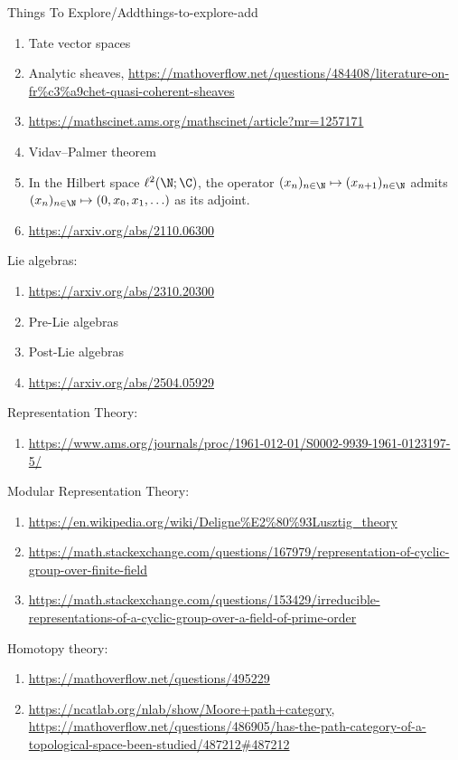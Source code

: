 \begin{remark}{Things To Explore/Add}{things-to-explore-add}
\begin{enumerate}
        \item Tate vector spaces
        \item Analytic sheaves, \url{https://mathoverflow.net/questions/484408/literature-on-fr\%c3\%a9chet-quasi-coherent-sheaves}
        \item \url{https://mathscinet.ams.org/mathscinet/article?mr=1257171}
        \item Vidav--Palmer theorem
        \item In the Hilbert space $\ell^{2}(\N;\C)$, the operator $(x_{n})_{n\in\N}\mapsto(x_{n+1})_{n\in\N}$ admits $(x_{n})_{n\in\N}\mapsto(0,x_{0},x_{1},\ldots)$ as its adjoint.
        \item \url{https://arxiv.org/abs/2110.06300}
    \end{enumerate}
    Lie algebras:
    \begin{enumerate}
        \item \url{https://arxiv.org/abs/2310.20300}
        \item Pre-Lie algebras
        \item Post-Lie algebras
        \item \url{https://arxiv.org/abs/2504.05929}
    \end{enumerate}
    Representation Theory:
    \begin{enumerate}
        \item \url{https://www.ams.org/journals/proc/1961-012-01/S0002-9939-1961-0123197-5/}
    \end{enumerate}
    Modular Representation Theory:
    \begin{enumerate}
        \item \url{https://en.wikipedia.org/wiki/Deligne\%E2\%80\%93Lusztig\_theory}
        \item \url{https://math.stackexchange.com/questions/167979/representation-of-cyclic-group-over-finite-field}
        \item \url{https://math.stackexchange.com/questions/153429/irreducible-representations-of-a-cyclic-group-over-a-field-of-prime-order}
    \end{enumerate}
    Homotopy theory:
    \begin{enumerate}
        \item \url{https://mathoverflow.net/questions/495229}
        \item \url{https://ncatlab.org/nlab/show/Moore+path+category}, \url{https://mathoverflow.net/questions/486905/has-the-path-category-of-a-topological-space-been-studied/487212#487212}

\end{enumerate}
\end{remark}
